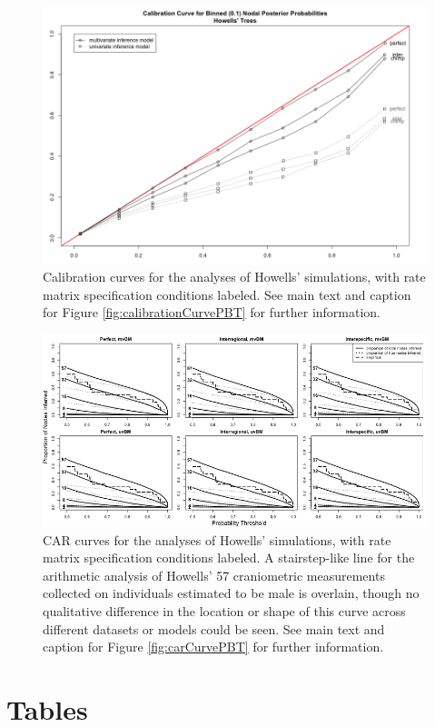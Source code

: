 \begin{figure}[h]
\centering
\includegraphics[width=120mm]{figures/calibrationCurveHowells.png}
\caption[Calibration Curves for the Brownian Motion Simulation Study, Empirically Parameterized Conditions]{Calibration curves for the analyses of Howells’ simulations, with rate matrix specification conditions labeled. See main text and caption for Figure \ref{fig:calibrationCurvePBT} for further information.
\label{overflow}
\label{fig:calibrationCurveHowells}
}
\end{figure}

\begin{figure}[h]
\centering
\includegraphics[width=160mm]{figures/CARcurvesHowells_BW.png}
\caption[Cumulative Average Resolution Curves for the Brownian Motion Simulation Study, Empirically Parameterized Conditions]{CAR curves for the analyses of Howells’ simulations, with rate matrix specification conditions labeled. A stairstep-like line for the arithmetic analysis of Howells’ 57 craniometric measurements collected on individuals estimated to be male is overlain, though no qualitative difference in the location or shape of this curve across different datasets or models could be seen. See main text and caption for Figure \ref{fig:carCurvePBT} for further information.
\label{overflow}
\label{fig:carCurveHowells}
}
\end{figure}

\clearpage

\section{Tables}


